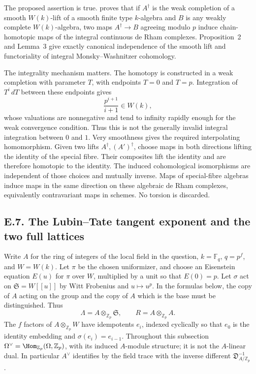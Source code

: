 The proposed assertion is true.  \cite[Proposition~1]{ErtlSprang2018} proves that if $A^\dagger$ is the weak completion of a smooth $W(k)$-lift of a smooth finite type $k$-algebra and $B$ is any weakly complete $W(k)$-algebra, two maps $A^\dagger\to B$ agreeing modulo $p$ induce chain-homotopic maps of the integral continuous de Rham complexes.  Proposition~2 and Lemma~3 give exactly canonical independence of the smooth lift and functoriality of integral Monsky--Washnitzer cohomology.

The integrality mechanism matters.  The homotopy is constructed in a weak completion with parameter $T$, with endpoints $T=0$ and $T=p$.  Integration of $T^i\,dT$ between these endpoints gives
\[
 \frac{p^{i+1}}{i+1}\in W(k),
\]
whose valuations are nonnegative and tend to infinity rapidly enough for the weak convergence condition.  Thus this is not the generally invalid integral integration between $0$ and $1$.  Very smoothness gives the required interpolating homomorphism.  Given two lifts $A^\dagger,(A')^\dagger$, choose maps in both directions lifting the identity of the special fibre.  Their composites lift the identity and are therefore homotopic to the identity.  The induced cohomological isomorphisms are independent of those choices and mutually inverse.  Maps of special-fibre algebras induce maps in the same direction on these algebraic de Rham complexes, equivalently contravariant maps in schemes.  No torsion is discarded.

\subsection{E.7. The Lubin--Tate tangent exponent and the two full lattices}

Write $A$ for the ring of integers of the local field in the question, $k=\mathbb F_q$, $q=p^f$, and $W=W(k)$.  Let $\pi$ be the chosen uniformizer, and choose an Eisenstein equation $E(u)$ for $\pi$ over $W$, multiplied by a unit so that $E(0)=p$.  Let $\sigma$ act on $\mathfrak S=W[[u]]$ by Witt Frobenius and $u\mapsto u^p$.  In the formulas below, the copy of $A$ acting on the group and the copy of $A$ which is the base must be distinguished.  Thus
\[
 \Lambda=A\otimes_{\mathbb Z_p}\mathfrak S,
 \qquad R=A\otimes_{\mathbb Z_p}A.
\]
The $f$ factors of $A\otimes_{\mathbb Z_p}W$ have idempotents $e_i$, indexed cyclically so that $e_0$ is the identity embedding and $\sigma(e_i)=e_{i-1}$.  Throughout this subsection $\Omega^\vee=\Hom_{\mathbb Z_p}(\Omega,\mathbb Z_p)$, with its induced $A$-module structure; it is not the $A$-linear dual.  In particular $A^\vee$ identifies by the field trace with the inverse different $\mathfrak D_{A/\mathbb Z_p}^{-1}$.


